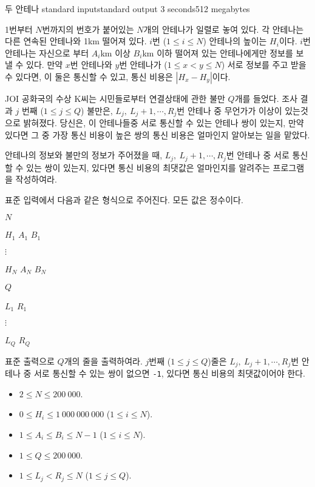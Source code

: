 \begin{problem}{두 안테나}
	{standard input}{standard output}
	{3 seconds}{512 megabytes}{}
	
	1번부터 $N$번까지의 번호가 붙어있는 $N$개의 안테나가 일렬로 놓여 있다. 각 안테나는 다른 연속된 안테나와 1km 떨어져 있다. $i$번 ($1 \le i \le N$) 안테나의 높이는 $H_i$이다. $i$번 안테나는 자신으로 부터 $A_i$km 이상 $B_i$km 이하 떨어져 있는 안테나에게만 정보를 보낼 수 있다. 만약 $x$번 안테나와 $y$번 안테나가 ($1 \le x < y \le N$) 서로 정보를 주고 받을 수 있다면, 이 둘은 통신할 수 있고, 통신 비용은 $|H_x - H_y|$이다.
	
	JOI 공화국의 수상 K씨는 시민들로부터 연결상태에 관한 불만 $Q$개를 들었다. 조사 결과 $j$ 번째 ($1 \le j \le Q$) 불만은, $L_j, \ L_j +1, \cdots, R_j$번 안테나 중 무언가가 이상이 있는것으로 밝혀졌다. 당신은, 이 안테나들중 서로 통신할 수 있는 안테나 쌍이 있는지, 만약 있다면 그 중 가장 통신 비용이 높은 쌍의 통신 비용은 얼마인지 알아보는 일을 맡았다.
	
	안테나의 정보와 불만의 정보가 주어졌을 때, $L_j, \ L_j +1, \cdots, R_j$번 안테나 중 서로 통신할 수 있는 쌍이 있는지, 있다면 통신 비용의 최댓값은 얼마인지를 알려주는 프로그램을 작성하여라.
	
	\InputFile
	
	표준 입력에서 다음과 같은 형식으로 주어진다. 모든 값은 정수이다.

	$N$
	
	$H_1$ $A_1$ $B_1$
	
	$\vdots$
	
	$H_N$ $A_N$ $B_N$

	$Q$
	
	$L_1$ $R_1$
	
	$\vdots$
	
	$L_Q$ $R_Q$
	
	\OutputFile
	
	표준 출력으로 $Q$개의 줄을 출력하여라. $j$번째 ($1 \le j \le Q$)줄은 $L_j, \ L_j +1, \cdots, R_j$번 안테나 중 서로 통신할 수 있는 쌍이 없으면 \texttt{-1}, 있다면 통신 비용의 최댓값이어야 한다.
	
	\Constraints
	
	\begin{itemize}
	
	\item $2 \le N \le 200\ 000$.
	\item $0 \le H_i \le 1\ 000\ 000\ 000$ ($1 \le i \le N$).
	\item $1 \le A_i \le B_i \le N-1$ ($1 \le i \le N$).
	\item $1 \le Q \le 200\ 000$.
	\item $1 \le L_j < R_j \le N$ ($1 \le j \le Q$).
		

\end{itemize}
\end{problem}

